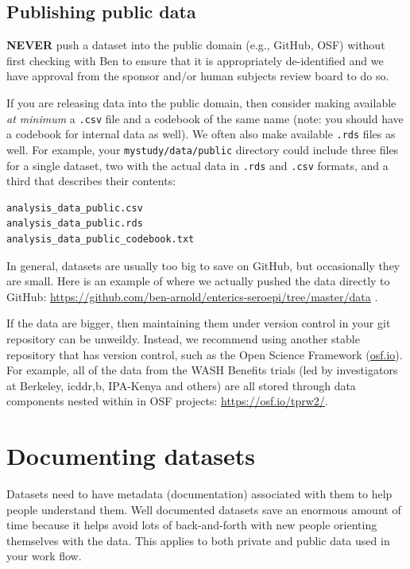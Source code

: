 \documentclass[]{book}
\begin{document}
\hypertarget{publishing-public-data}{%
\subsection{Publishing public data}\label{publishing-public-data}}

\textbf{NEVER} push a dataset into the public domain (e.g., GitHub, OSF) without first checking with Ben to ensure that it is appropriately de-identified and we have approval from the sponsor and/or human subjects review board to do so.

If you are releasing data into the public domain, then consider making available \emph{at minimum} a \texttt{.csv} file and a codebook of the same name (note: you should have a codebook for internal data as well). We often also make available \texttt{.rds} files as well. For example, your \texttt{mystudy/data/public} directory could include three files for a single dataset, two with the actual data in \texttt{.rds} and \texttt{.csv} formats, and a third that describes their contents:

\begin{verbatim}
analysis_data_public.csv
analysis_data_public.rds
analysis_data_public_codebook.txt
\end{verbatim}

In general, datasets are usually too big to save on GitHub, but occasionally they are small. Here is an example of where we actually pushed the data directly to GitHub: \url{https://github.com/ben-arnold/enterics-seroepi/tree/master/data} .

If the data are bigger, then maintaining them under version control in your git repository can be unweildy. Instead, we recommend using another stable repository that has version control, such as the Open Science Framework (\href{https://osf.io}{osf.io}). For example, all of the data from the WASH Benefits trials (led by investigators at Berkeley, icddr,b, IPA-Kenya and others) are all stored through data components nested within in OSF projects: \url{https://osf.io/tprw2/}.

\hypertarget{documenting-datasets}{%
\section{Documenting datasets}\label{documenting-datasets}}

Datasets need to have metadata (documentation) associated with them to help people understand them. Well documented datasets save an enormous amount of time because it helps avoid lots of back-and-forth with new people orienting themselves with the data. This applies to both private and public data used in your work flow.
\end{document}
